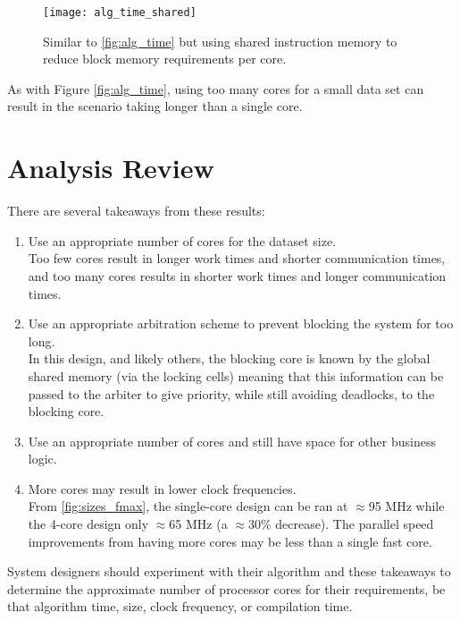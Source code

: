 \begin{figure}[h]
\centering
\texttt{[image: alg\_time\_shared]}
\caption{Similar to \cref{fig:alg_time} but using shared instruction memory to reduce block memory requirements per core.}
\label{fig:alg_time_shared}
\end{figure}

As with Figure \ref{fig:alg_time}, using too many cores for a small data set can result in the scenario taking longer than a single core.

\clearpage
\section{Analysis Review}
There are several takeaways from these results:
\begin{enumerate}
\item Use an appropriate number of cores for the dataset size.\\Too few cores result in longer work times and shorter communication times, and too many cores results in shorter work times and longer communication times.

\item Use an appropriate arbitration scheme to prevent blocking the system for too long.\\
In this design, and likely others, the blocking core is known by the global shared memory (via the locking cells) meaning that this information can be passed to the arbiter to give priority, while still avoiding deadlocks, to the blocking core.

\item Use an appropriate number of cores and still have space for other business logic.

\item More cores may result in lower clock frequencies.\\From \cref{fig:sizes_fmax}, the single-core design can be ran at $\approx$95 MHz while the 4-core design only $\approx$65 MHz (a $\approx$30\% decrease). The parallel speed improvements from having more cores may be less than a single fast core.
\end{enumerate}

System designers should experiment with their algorithm and these takeaways to determine the approximate number of processor cores for their requirements, be that algorithm time, size, clock frequency, or compilation time.



